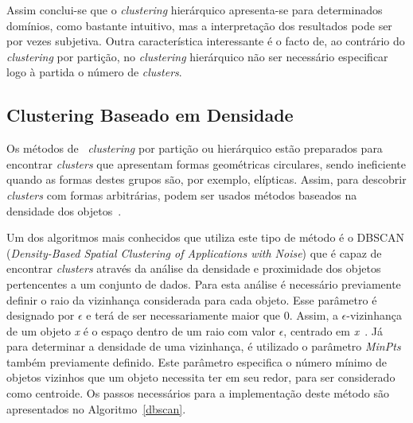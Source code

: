 Assim conclui-se que o \textit{clustering} hierárquico apresenta-se para determinados domínios, como bastante intuitivo, mas a interpretação dos resultados pode ser por vezes subjetiva. Outra característica interessante é o facto de, ao contrário do \textit{clustering} por partição, no \textit{clustering} hierárquico não ser necessário especificar logo à partida o número de \textit{clusters}. 

\subsection{Clustering Baseado em Densidade} \label{subsec:dbscan} 

Os métodos de ~\textit{clustering} por partição ou hierárquico estão preparados para encontrar \textit{clusters} que apresentam formas geométricas circulares, sendo ineficiente quando as formas destes grupos são, por exemplo, elípticas. Assim, para descobrir \textit{clusters} com formas arbitrárias, podem ser usados métodos baseados na densidade dos objetos~\cite{Han2006}. 

Um dos algoritmos mais conhecidos que utiliza este tipo de método é o DBSCAN (\textit{Density-Based Spatial Clustering of Applications with Noise}) que é capaz de encontrar \textit{clusters} através da análise da densidade e proximidade dos objetos pertencentes a um conjunto de dados. Para esta análise é necessário previamente definir o raio da vizinhança considerada para cada objeto. Esse parâmetro é designado por $ \epsilon $ e terá de ser necessariamente maior que 0. Assim,  a $ \epsilon $-vizinhança de um objeto \textit{x} é o espaço dentro de um raio com valor $ \epsilon $, centrado em \textit{x}~\cite{Han2006}. Já para determinar a densidade de uma vizinhança, é utilizado o parâmetro \textit{MinPts} também previamente definido. Este parâmetro especifica o número mínimo de objetos vizinhos que um objeto necessita ter em seu redor, para ser considerado como centroide.
Os passos necessários para a implementação deste método são apresentados no Algoritmo~\ref{dbscan}.

